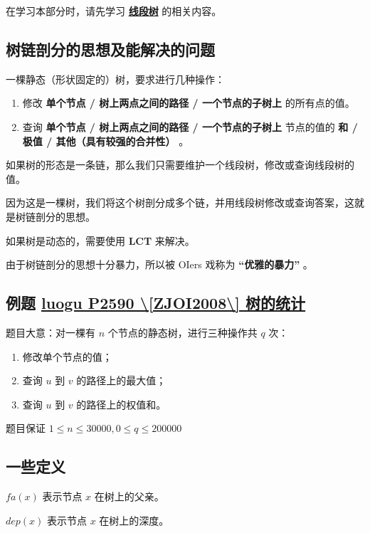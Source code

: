 
在学习本部分时，请先学习 \textbf{\href{/ds/segment/}{线段树}} 的相关内容。

\subsection{树链剖分的思想及能解决的问题}

一棵静态（形状固定的）树，要求进行几种操作：

\begin{enumerate}
\item 修改 \textbf{单个节点 / 树上两点之间的路径 / 一个节点的子树上} 的所有点的值。
\item 查询 \textbf{单个节点 / 树上两点之间的路径 / 一个节点的子树上} 节点的值的 \textbf{和 / 极值 / 其他（具有较强的合并性）} 。
\end{enumerate}

如果树的形态是一条链，那么我们只需要维护一个线段树，修改或查询线段树的值。

因为这是一棵树，我们将这个树剖分成多个链，并用线段树修改或查询答案，这就是树链剖分的思想。

如果树是动态的，需要使用 \textbf{LCT} 来解决。

由于树链剖分的思想十分暴力，所以被 OIers 戏称为 \textbf{“优雅的暴力”} 。

\subsection{例题 \href{https://www.luogu.org/problemnew/show/P2590}{luogu P2590 \textbackslash{}[ZJOI2008\textbackslash{}] 树的统计}}

题目大意：对一棵有 $n$ 个节点的静态树，进行三种操作共 $q$ 次：

\begin{enumerate}
\item 修改单个节点的值；
\item 查询 $u$ 到 $v$ 的路径上的最大值；
\item 查询 $u$ 到 $v$ 的路径上的权值和。
\end{enumerate}

题目保证 $1\le n\le 30000,0\le q\le 200000$

\subsection{一些定义}

$fa(x)$ 表示节点 $x$ 在树上的父亲。

$dep(x)$ 表示节点 $x$ 在树上的深度。

